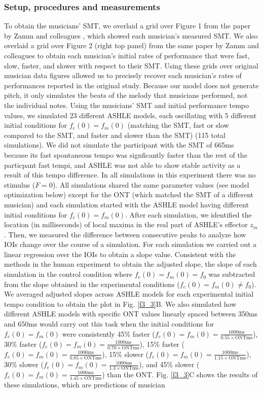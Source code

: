 \documentclass{report}
\begin{document}
\subsubsection{Setup, procedures and measurements}

To obtain the musicians' SMT, we overlaid a grid over Figure 1 from the paper by Zamm and colleagues \cite{zamm2018musicians}, which showed each musician's measured SMT. We also overlaid a grid over Figure 2 (right top panel) from the same paper by Zamm and colleagues to obtain each musician's initial rates of performance that were fast, slow, faster, and slower with respect to their SMT. Using these grids over original musician data figures allowed us to precisely recover each musician's rates of performances reported in the original study. Because our model does not generate pitch, it only simulates the beats of the melody that musicians performed, not the individual notes. Using the musicians' SMT and initial performance tempo values, we simulated 23 different ASHLE models, each oscillating with 5 different initial conditions for $f_e(0)=f_m(0)$ (matching the SMT, fast or slow compared to the SMT, and faster and slower than the SMT) (115 total simulations). We did not simulate the participant with the SMT of 665ms because its fast spontaneous tempo was signficantly faster than the rest of the particpant fast tempi, and ASHLE was not able to show stable activity as a result of this tempo difference. In all simulations in this experiment there was no stimulus ($F = 0$). All simulations shared the same parameter values (see model optimization below) except for the ONT (which matched the SMT of a different musician) and each simulation started with the ASHLE model having different initial conditions for $f_e(0)=f_m(0)$. After each simulation, we identified the location (in milliseconds) of local maxima in the real part of ASHLE's effector $z_m$. Then, we measured the difference between consecutive peaks to analyze how IOIs change over the course of a simulation. For each simulation we carried out a linear regression over the IOIs to obtain a slope value. Consistent with the methods in the human experiment to obtain the adjusted slope, the slope of each simulation in the control condition where $f_e(0)=f_m(0)=f_0$ was subtracted from the slope obtained in the experimental conditions ($f_e(0)=f_m(0)\neq f_0$). We averaged adjusted slopes across ASHLE models for each experimental initial tempo condition to obtain the plot in Fig.{} \ref{f3_3}B. We also simulated how different ASHLE models with specific ONT values linearly spaced between 350ms and 650ms would carry out this task when the initial conditions for $f_e(0)=f_m(0)$ were consistently 45\% faster ($f_e(0)=f_m(0)=\frac{1000\text{ms}}{0.55 \times \text{ONTms}}$), 30\% faster ($f_e(0)=f_m(0)=\frac{1000\text{ms}}{0.70 \times \text{ONTms}}$), 15\% faster ($f_e(0)=f_m(0)=\frac{1000\text{ms}}{0.85 \times \text{ONTms}}$), 15\% slower ($f_e(0)=f_m(0)=\frac{1000\text{ms}}{1.15 \times \text{ONTms}}$), 30\% slower ($f_e(0)=f_m(0)=\frac{1000\text{ms}}{1.3 \times \text{ONTms}}$), and 45\% slower ($f_e(0)=f_m(0)=\frac{1000\text{ms}}{1.45 \times \text{ONTms}}$) than the ONT. Fig.{} \ref{f3_3}C shows the results of these simulations, which are predictions of musician 
\end{document}
